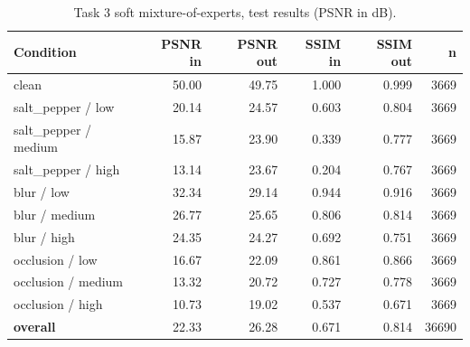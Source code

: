 \begin{table}[t]
\centering
\caption{Task 3 soft mixture-of-experts, test results (PSNR in dB).}
\label{tab:t3_test}
\footnotesize
\begin{tabular}{lrrrrr}
\toprule
Condition & PSNR in & PSNR out & SSIM in & SSIM out & n \\
\midrule
clean & 50.00 & 49.75 & 1.000 & 0.999 & 3669 \\
salt\_pepper / low & 20.14 & 24.57 & 0.603 & 0.804 & 3669 \\
salt\_pepper / medium & 15.87 & 23.90 & 0.339 & 0.777 & 3669 \\
salt\_pepper / high & 13.14 & 23.67 & 0.204 & 0.767 & 3669 \\
blur / low & 32.34 & 29.14 & 0.944 & 0.916 & 3669 \\
blur / medium & 26.77 & 25.65 & 0.806 & 0.814 & 3669 \\
blur / high & 24.35 & 24.27 & 0.692 & 0.751 & 3669 \\
occlusion / low & 16.67 & 22.09 & 0.861 & 0.866 & 3669 \\
occlusion / medium & 13.32 & 20.72 & 0.727 & 0.778 & 3669 \\
occlusion / high & 10.73 & 19.02 & 0.537 & 0.671 & 3669 \\
\textbf{overall} & 22.33 & 26.28 & 0.671 & 0.814 & 36690 \\
\bottomrule
\end{tabular}
\end{table}
